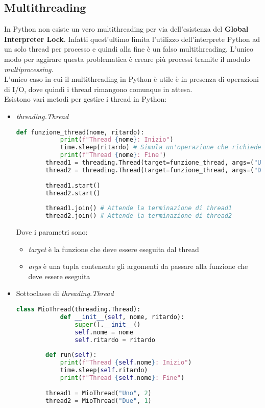 \subsection{Multithreading}
In Python non esiste un vero multithreading per via dell'esistenza del \textbf{Global Interpreter Lock}. Infatti quest'ultimo limita l'utilizzo dell'interprete Python ad un solo thread per processo e quindi alla fine è un falso multithreading. L'unico modo per aggirare questa problematica è creare più processi tramite il modulo \textit{multiprocessing}.\\
L'unico caso in cui il multithreading in Python è utile è in presenza di operazioni di I/O, dove quindi i thread rimangono comunque in attesa.\\
Esistono vari metodi per gestire i thread in Python:
\begin{itemize}
	\item \textit{threading.Thread}
	\begin{lstlisting}[language=Python]		
		def funzione_thread(nome, ritardo):
			print(f"Thread {nome}: Inizio")
			time.sleep(ritardo) # Simula un'operazione che richiede tempo
			print(f"Thread {nome}: Fine")
		thread1 = threading.Thread(target=funzione_thread, args=("Uno", 2))
		thread2 = threading.Thread(target=funzione_thread, args=("Due", 1))
		
		thread1.start()
		thread2.start()
		
		thread1.join() # Attende la terminazione di thread1
		thread2.join() # Attende la terminazione di thread2
	\end{lstlisting}
	Dove i parametri sono:
	\begin{itemize}
		\item \textit{target} è la funzione che deve essere eseguita dal thread
		\item \textit{args} è una tupla contenente gli argomenti da passare alla funzione che deve essere eseguita
	\end{itemize}
	\item Sottoclasse di \textit{threading.Thread}
	\begin{lstlisting}[language=Python]		
		class MioThread(threading.Thread):
			def __init__(self, nome, ritardo):
				super().__init__()
				self.nome = nome
				self.ritardo = ritardo
		
		def run(self):
			print(f"Thread {self.nome}: Inizio")
			time.sleep(self.ritardo)
			print(f"Thread {self.nome}: Fine")
		
		thread1 = MioThread("Uno", 2)
		thread2 = MioThread("Due", 1)
		

\end{lstlisting}
\end{itemize}

